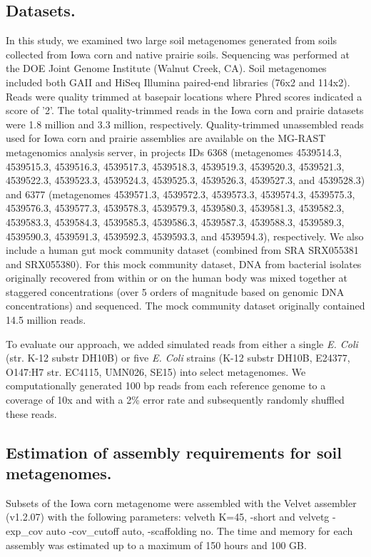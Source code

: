 \documentclass{pnastwo}
\begin{document}
\begin{article}
\subsection*{Datasets.}
In this study, we examined two large soil metagenomes generated from
soils collected from Iowa corn and native prairie soils.  Sequencing
was performed at the DOE Joint Genome Institute (Walnut Creek, CA).  Soil metagenomes included both
GAII and HiSeq Illumina paired-end libraries (76x2 and 114x2).  
Reads were quality trimmed at basepair locations where Phred scores indicated a score of
'2'.  The total quality-trimmed reads in the Iowa corn and prairie
datasets were 1.8 million and 3.3 million, respectively.  Quality-trimmed unassembled reads used for Iowa corn and prairie assemblies are available on the MG-RAST metagenomics analysis server, in projects IDs 6368 (metagenomes 
4539514.3, 
4539515.3, 
4539516.3, 
4539517.3, 
4539518.3, 
4539519.3, 
4539520.3, 
4539521.3, 
4539522.3, 
4539523.3, 
4539524.3, 
4539525.3, 
4539526.3, 
4539527.3, and
4539528.3) 
and 6377 (metagenomes  4539571.3, 
4539572.3, 
4539573.3, 
4539574.3, 
4539575.3, 
4539576.3, 
4539577.3, 
4539578.3, 
4539579.3, 
4539580.3, 
4539581.3, 
4539582.3, 
4539583.3, 
4539584.3, 
4539585.3, 
4539586.3, 
4539587.3, 
4539588.3, 
4539589.3, 
4539590.3, 
4539591.3, 
4539592.3, 
4539593.3, and
4539594.3), respectively.  We also
include a human gut mock community dataset (combined from SRA
SRX055381 and SRX055380).  For this mock community dataset, DNA from
bacterial isolates originally recovered from within or on the human
body was mixed together at staggered concentrations (over 5 orders of
magnitude based on genomic DNA concentrations) and sequenced.  The
mock community dataset originally contained 14.5 million reads.

To evaluate our approach, we added simulated reads from either a
single \emph{E. Coli} (str. K-12 substr DH10B) or five \emph{E. Coli} strains (K-12
substr DH10B, E24377, O147:H7 str. EC4115, UMN026, SE15) into select
metagenomes.  We computationally generated 100 bp reads from each
reference genome to a coverage of 10x and with a 2\% error rate and
subsequently randomly shuffled these reads.

\subsection*{Estimation of assembly requirements for soil metagenomes.}
Subsets of the Iowa corn metagenome were assembled with the Velvet
assembler (v1.2.07) with the following parameters: velveth K=45,
-short and velvetg -exp\_cov auto -cov\_cutoff auto, -scaffolding no.
The time and memory for each assembly was estimated up to a maximum of
150 hours and 100 GB.


\end{article}
\end{document}
